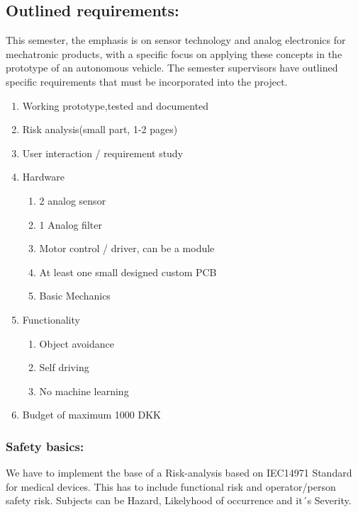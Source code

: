 \documentclass[../report.tex]{subfiles}
\begin{document}
\subsection{Outlined requirements:}
This semester, the emphasis is on sensor technology and analog electronics for
mechatronic products, with a specific focus on applying these concepts in the
prototype of an autonomous vehicle. The semester supervisors have outlined
specific requirements that must be incorporated into the project.
\begin{enumerate}
    \item Working prototype,tested and documented
    \item Risk analysis(small part, 1-2 pages)
    \item User interaction / requirement study
    \item Hardware\begin{enumerate}
        \item 2 analog sensor
        \item 1 Analog filter
        \item Motor control / driver, can be a module
        \item At least one small designed custom PCB
        \item Basic Mechanics
    \end{enumerate}
    \item Functionality\begin{enumerate}
        \item Object avoidance
        \item Self driving
        \item No machine learning
    \end{enumerate}
    \item Budget of maximum 1000 DKK
\end{enumerate}
\subsubsection{Safety basics:}
We have to implement the base of a Risk-analysis based on IEC14971 Standard for medical devices.
This has to include functional risk and operator/person safety risk. Subjects can be Hazard, Likelyhood
of occurrence and it´s Severity.
\end{document}
